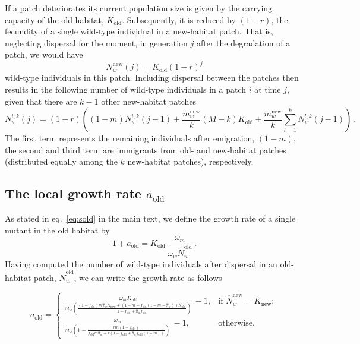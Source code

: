 \documentclass[a4paper,11pt]{scrartcl}
\newcommand{\chg}[1]{\textcolor{change}{#1}}
\begin{document}
\chg{If a patch deteriorates its current population size is given by the carrying capacity of the old habitat, $K_{\text{old}}$. Subsequently, it is reduced by $(1-r)$, the fecundity of a single wild-type individual in a new-habitat patch. That is, neglecting dispersal for the moment, in generation $j$ after the degradation of a patch, we would have 
\begin{equation}
    N_w^{\text{new}}(j) = K_{\text{old}}(1-r)^j
\end{equation}
wild-type individuals in this patch. Including dispersal between the patches then results in the following number of wild-type individuals in a patch $i$ at time $j$, given that there are $k-1$ other new-habitat patches
\begin{equation}
    N_w^{i,k}(j) = (1-r)\left((1-m)N_w^{i,k}(j-1) + \frac{m_w^{\text{new}}}{k} (M-k) K_{\text{old}} + \frac{m_w^{\text{new}}}{k} \sum_{l=1}^k N_w^{l,k}(j-1) \right)\ .
\end{equation}
The first term represents the remaining individuals after emigration, $(1-m)$, the second and third term are immigrants from old- and new-habitat patches (distributed equally among the $k$ new-habitat patches), respectively. 
}

\subsection*{The local growth rate $a_{\text{old}}$}
As stated in eq.~\eqref{eq:sold} in the main text, we define the growth rate of a single mutant in the old habitat by
\begin{equation}
    1 + a_{\text{old}} = K_{\text{old}}\, \frac{\omega_m}{\omega_w \widetilde{N}_w^{\text{old}}}\, .    
\end{equation}
%
Having computed the number of wild-type individuals after dispersal in an old-habitat patch, $\widetilde{N}_w^{\text{old}}$, we can write the growth rate as follows

\begin{equation}\label{Seq:s_old}
    a_{\text{old}} = \left\{ \begin{array}{ll}
        \frac{\omega_m K_{\text{old}}}{\omega_w \left(\frac{(1-f_{\text{old}})m\widehat{\pi}_w K_{\text{new}} + (1-m-f_{\text{old}}(1-m-\widehat{\pi}_w))K_{\text{old}}}{1-f_{\text{old}}+\widehat{\pi}_w f_{\text{old}}} \right)}\, - 1 , & \text{if } \widehat{N}_w^{\text{new}} = K_{\text{new}};  \\
        \frac{\omega_m}{\omega_w \left(1 - \frac{rm(1-f_{\text{old}})}{f_{\text{old}}m\widehat{\pi}_w + r(1-f_{\text{old}}+\widehat{\pi}_w f_{\text{old}}(1-m))}\right)}\, - 1 , & \text{otherwise}. 
    \end{array}
    \right.
\end{equation}
\end{document}
